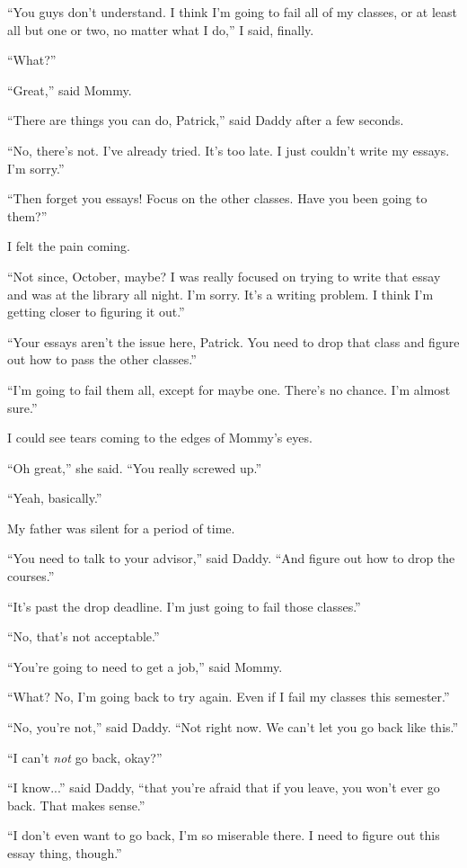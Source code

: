 ``You guys don't understand.  I think I'm going to fail all of my classes, or at
least all but one or two, no matter what I do,'' I said, finally.

``What?''

``Great,'' said Mommy.

``There are things you can do, Patrick,'' said Daddy after a few seconds.

``No, there's not.  I've already tried.  It's too late.  I just couldn't write my essays.  I'm
sorry.''

``Then forget you essays!  Focus on the other classes.  Have you been going to
them?''

I felt the pain coming.

``Not since, October, maybe?  I was really focused on trying to write that essay
and was at the library all night.  I'm sorry.  It's a writing problem.  I think
I'm getting closer to figuring it out.''
 
``Your essays aren't the issue here, Patrick.  You need to drop that class and
figure out how to pass the other classes.''

``I'm going to fail them all, except for maybe one.  There's no chance.  I'm
almost sure.''

I could see tears coming to the edges of Mommy's eyes.

``Oh great,'' she said.  ``You really screwed up.''

``Yeah, basically.''

My father was silent for a period of time.

``You need to talk to your advisor,'' said Daddy.  ``And figure out how to drop the
courses.''

``It's past the drop deadline.  I'm just going to fail those classes.''

``No, that's not acceptable.''

``You're going to need to get a job,'' said Mommy.

``What?  No, I'm going back to try again.  Even if I fail my classes this semester.''

``No, you're not,'' said Daddy.  ``Not right now.  We can't let you go back like this.''

``I can't \textit{not} go back, okay?''

``I know...'' said Daddy, ``that you're afraid that if you leave, you won't ever go
back.  That makes sense.''

``I don't even want to go back, I'm so miserable there.  I need to figure out
this essay thing, though.''

